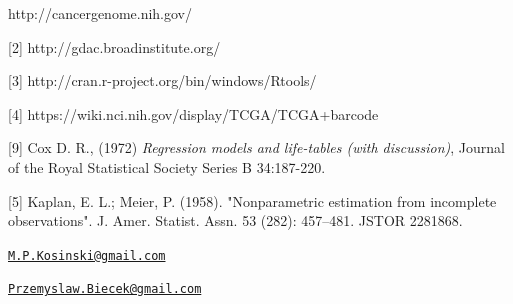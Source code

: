 \newpage

\begin{Schunk}
\begin{Sinput}
[1] http://cancergenome.nih.gov/

[2] http://gdac.broadinstitute.org/
   
[3] http://cran.r-project.org/bin/windows/Rtools/
   
[4] https://wiki.nci.nih.gov/display/TCGA/TCGA+barcode

[9] Cox D. R., (1972) \textit{Regression models and life-tables (with discussion)}, Journal of the Royal Statistical Society Series B 34:187-220.      
      
[5]  Kaplan, E. L.; Meier, P. (1958). "Nonparametric estimation from incomplete observations". J. Amer. Statist. Assn. 53 (282): 457–481. JSTOR 2281868.


\end{Sinput}
\end{Schunk}

\address{
Marcin Kosinski\\
Warsaw University of Technology\\
Faculty of Mathematics and Information Science\\ Koszykowa 75, 00-662 Warsaw, Poland\\
}
\href{mailto:M.P.Kosinski@gmail.com}{\nolinkurl{M.P.Kosinski@gmail.com}}

\address{
Przemysław Biecek\\
University of Warsaw\\
Faculty of Mathematics, Informatics, and Mechanics\\ Banacha 2, 02-097 Warsaw, Poland\\
}
\href{mailto:Przemyslaw.Biecek@gmail.com}{\nolinkurl{Przemyslaw.Biecek@gmail.com}}

